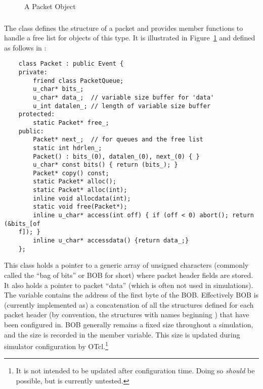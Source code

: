 \begin{figure}[h]
\centerline{}
\caption{\label{pic:packet}A Packet Object}
\end{figure}

\subsubsection{}

The  class defines the structure of a
packet and provides member functions to handle a
free list for objects of this type.
It is illustrated in Figure~\ref{pic:packet} and
defined as follows in :
\begin{small}
\begin{verbatim}
	class Packet : public Event {
	private:
		friend class PacketQueue;
		u_char* bits_;  
		u_char* data_;  // variable size buffer for 'data'
		u_int datalen_; // length of variable size buffer
	protected:
		static Packet* free_;
	public: 
		Packet* next_;  // for queues and the free list
		static int hdrlen_;
		Packet() : bits_(0), datalen_(0), next_(0) { }
		u_char* const bits() { return (bits_); }
		Packet* copy() const;
		static Packet* alloc();
		static Packet* alloc(int);
		inline void allocdata(int);
		static void free(Packet*);
		inline u_char* access(int off) { if (off < 0) abort(); return (&bits_[of
	f]); }  
		inline u_char* accessdata() {return data_;}
	};

\end{verbatim}
\end{small}
This class holds a pointer to a generic array of unsigned
characters (commonly called the ``bag of bits'' or BOB for short)
where packet header fields are stored.
It also holds a pointer to packet ``data'' (which is often not used in
simulations).
The  variable contains the address of
the first byte of the BOB.
Effectively BOB is (currently implemented as) a concatenation
of all the structures defined for each packet header (by convention,
the structures with names beginning ) that have
been configured in.
BOB generally remains a fixed size throughout a simulation, and
the size is recorded in the  member
variable.
This size is updated during simulator configuration by
OTcl.\footnote{It is not intended to be updated after configuration
time.  Doing so {\em should} be possible, but is currently untested.}

